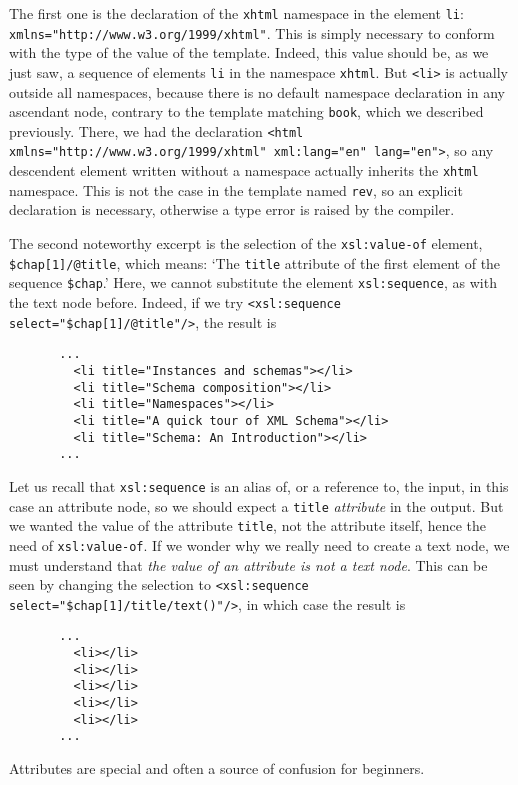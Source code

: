 The first one is the declaration of the \texttt{xhtml} namespace in
the element \texttt{li}:
\texttt{xmlns="http://www.w3.org/1999/xhtml"}. This is simply
necessary to conform with the type of the value of the
template. Indeed, this value should be, as we just saw, a sequence of
elements \texttt{li} in the namespace \texttt{xhtml}. But
\texttt{<li>} is actually outside all namespaces, because there is no
default namespace declaration in any ascendant node, contrary to the
template matching \texttt{book}, which we described previously. There,
we had the declaration \texttt{<html
  xmlns="http://www.w3.org/1999/xhtml" xml:lang="en" lang="en">}, so
any descendent element written without a namespace actually
inherits the \texttt{xhtml} namespace. This is not the case in the
template named \texttt{rev}, so an explicit declaration is necessary,
otherwise a type error is raised by the \XSLT compiler.

The second noteworthy excerpt is the selection of the
\texttt{xsl:value-of} element, \texttt{\$chap[1]/@title}, which means:
`The \texttt{title} attribute of the first element of the sequence
\texttt{\$chap}.' Here, we cannot substitute the element
\texttt{xsl:sequence}, as with the text node before. Indeed, if we try
\texttt{<xsl:sequence select="\$chap[1]/@title"/>}, the result is
\begin{verbatim}
       ...
         <li title="Instances and schemas"></li>
         <li title="Schema composition"></li>
         <li title="Namespaces"></li>
         <li title="A quick tour of XML Schema"></li>
         <li title="Schema: An Introduction"></li>
       ...
\end{verbatim}
Let us recall that \texttt{xsl:sequence} is an alias of, or a
reference to, the input, in this case an attribute node, so we should
expect a \texttt{title} \emph{attribute} in the output. But we wanted
the value of the attribute \texttt{title}, not the attribute itself,
hence the need of \texttt{xsl:value-of}. If we wonder why we really
need to create a text node, we must understand that \emph{the value of
  an attribute is not a text node}. This can be seen by changing the
selection to \texttt{<xsl:sequence select="\$chap[1]/title/text()"/>},
in which case the result is
\begin{verbatim}
       ...
         <li></li>
         <li></li>
         <li></li>
         <li></li>
         <li></li>
       ...
\end{verbatim}
Attributes are special and often a source of confusion for beginners.

